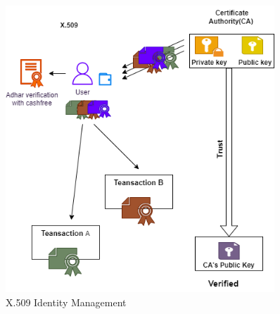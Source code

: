 \begin{figure}[htbp]
  \centering
  \includegraphics[width=0.9\textwidth]{Chapters/Chapter_5/figures/x.509.png}
  \caption{X.509 Identity Management }
  \label{fig:figure5_2}
  \end{figure}